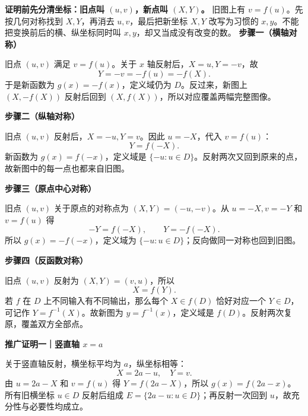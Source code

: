 \clearpage
\begin{proofbox}
\textbf{证明前先分清坐标：旧点叫 $(u,v)$，新点叫 $(X,Y)$。}
旧图上有 $v=f(u)$。先按几何对称找到 $X,Y$，再消去 $u,v$，最后把新坐标 $X,Y$ 改写为习惯的 $x,y$。不能把变换前后的横、纵坐标同时叫 $x,y$，却又当成没有改变的数。
\medskip
\textbf{步骤一（横轴对称）}


旧点 $(u,v)$ 满足 $v=f(u)$。关于 $x$ 轴反射后，$X=u,Y=-v$，故
\[Y=-v=-f(u)=-f(X).\]
于是新函数为 $g(x)=-f(x)$，定义域仍为 $D$。反过来，新图上 $(X,-f(X))$ 反射后回到 $(X,f(X))$，所以对应覆盖两幅完整图像。

\end{proofbox}
\clearpage
\begin{proofbox}
\textbf{步骤二（纵轴对称）}


旧点 $(u,v)$ 反射后，$X=-u,Y=v$。因此 $u=-X$，代入 $v=f(u)$：
\[Y=f(-X).\]
新函数为 $g(x)=f(-x)$，定义域是 $\{-u:u\in D\}$。反射两次又回到原来的点，故新图中的每一点也都来自旧图。

\end{proofbox}
\clearpage
\begin{proofbox}
\textbf{步骤三（原点中心对称）}


旧点 $(u,v)$ 关于原点的对称点为 $(X,Y)=(-u,-v)$。从 $u=-X,v=-Y$ 和 $v=f(u)$ 得
\[-Y=f(-X),\qquad Y=-f(-X).\]
所以 $g(x)=-f(-x)$，定义域为 $\{-u:u\in D\}$；反向做同一对称也回到旧图。

\end{proofbox}
\clearpage
\begin{proofbox}
\textbf{步骤四（反函数对称）}


旧点 $(u,v)$ 反射为 $(X,Y)=(v,u)$，所以
\[X=f(Y).\]
若 $f$ 在 $D$ 上不同输入有不同输出，那么每个 $X\in f(D)$ 恰好对应一个 $Y\in D$，可记作 $Y=f^{-1}(X)$。故新图为 $y=f^{-1}(x)$，定义域是 $f(D)$。反射两次复原，覆盖双方全部点。

\end{proofbox}
\clearpage
\begin{proofbox}
\textbf{推广证明一｜竖直轴 $x=a$}


关于竖直轴反射，横坐标平均为 $a$，纵坐标相等：
\[X=2a-u,\quad Y=v.\]
由 $u=2a-X$ 和 $v=f(u)$ 得 $Y=f(2a-X)$，所以 $g(x)=f(2a-x)$。
所有旧横坐标 $u\in D$ 反射后组成 $E=\{2a-u:u\in D\}$；再反射一次回到 $u$，故充分性与必要性均成立。

\end{proofbox}
